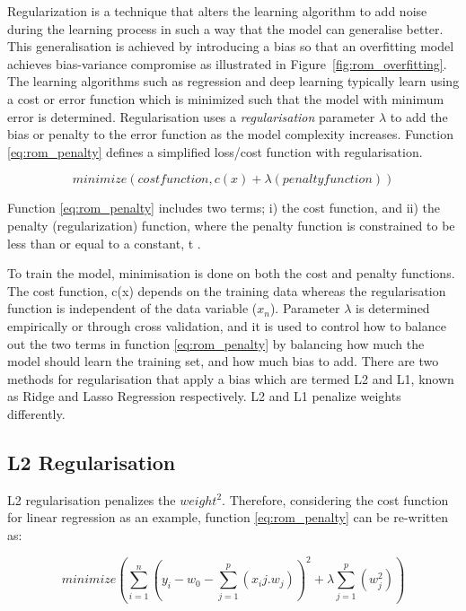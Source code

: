 Regularization is a technique that alters the learning algorithm to add noise during the learning process in such a way that the model can generalise better. This generalisation is achieved by introducing a bias so that an overfitting model achieves bias-variance compromise as illustrated in Figure~\ref{fig:rom_overfitting}. The learning algorithms such as regression and deep learning typically learn using a cost or error function which is minimized such that the model with minimum error is determined. Regularisation uses a \textit{regularisation} parameter $\lambda$ to add the bias or penalty to the error function as the model complexity increases. Function \ref{eq:rom_penalty}  defines a simplified loss/cost function with regularisation.

\begin{equation}
\label{eq:rom_penalty}
minimize ( cost function, c(x) + \lambda(penalty function) )
\end{equation}

Function  \ref{eq:rom_penalty} includes two terms; i) the cost function, and ii) the penalty (regularization) function, where the penalty function is constrained to be less than or equal to a constant, t \citep{friedman2001elements}.

To train the model, minimisation is done on both the cost and penalty functions. The cost function, c(x) depends on the training data whereas the regularisation function is independent of the data variable ($x_n$). Parameter $\lambda$ is determined empirically or through cross validation, and it is used to control how to balance out the two terms in function \ref{eq:rom_penalty}  by balancing how much the model should learn the training set, and how much bias to add. There are two methods for regularisation that apply a bias which are termed L2 and L1, known as Ridge  and Lasso Regression  respectively. L2 and L1 penalize weights differently.




\subsection{L2 Regularisation} 


L2 regularisation penalizes the $weight^2$. Therefore, considering the cost function for linear regression as an example, function \ref{eq:rom_penalty} can be re-written as:

\begin{equation}\label{rom_l2}
minimize ( \sum^{n}_{i=1}(y_i - w_0 - \sum^{p}_{j=1}(x_ij.w_j) )^2 + \lambda\sum^{p}_{j=1}(w_j^2) )
\end{equation}

